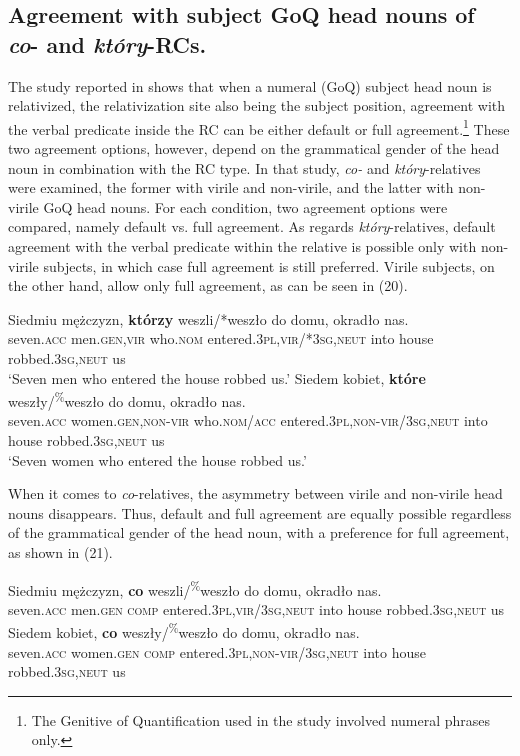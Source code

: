 \documentclass[output=paper]{langsci/langscibook}
\begin{document}
\subsection{Agreement with subject GoQ head nouns of \textit{co}{}- and \textit{który}{}-RCs.}%
The study reported in \citet{Łęska2016} shows that when a numeral (GoQ) subject head noun is relativized, the relativization site also being the subject position, agreement with the verbal predicate inside the RC can be either default or full agreement.\footnote{The Genitive of Quantification used in the study involved numeral phrases only.} These two agreement options, however, depend on the grammatical gender of the head noun in combination with the RC type. In that study, \textit{co-} and \textit{który}{}-relatives were examined, the former with virile and non-virile, and the latter with non-virile GoQ head nouns. For each condition, two agreement options were compared, namely default vs. full agreement. As regards \textit{który}{}-relatives, default agreement with the verbal predicate within the relative is possible only with non-virile subjects, in which case full agreement is still preferred. Virile subjects, on the other hand, allow only full agreement, as can be seen in (20).

\ea%
    \label{ex:leska:20}
    \ea
    \gll Siedmiu   mężczyzn,  \textbf{którzy}   weszli/*weszło  do   domu,   okradło     nas.        \\
          seven.\textsc{acc}   men.\textsc{gen,vir}   who.\textsc{nom}  entered.\textsc{3pl,vir/*3sg,neut}       into  house     robbed.\textsc{3sg,neut}   us   \\
    \glt ‘Seven men who entered the house robbed us.’
    \ex
    \gll  Siedem   kobiet,     \textbf{które}   weszły/\textsuperscript{\%}weszło       do   domu,   okradło     nas.  \\
           seven.\textsc{acc}   women.\textsc{gen,non-vir} who.\textsc{nom/acc}  entered.\textsc{3pl,non-vir}/\textsc{3sg,neut}  into   house     robbed.\textsc{3sg,neut}   us\\
    \glt  ‘Seven women who entered the house robbed us.’
    \z
\z    

When it comes to \textit{co}{}-relatives, the asymmetry between virile and non-virile head nouns disappears. Thus, default and full agreement are equally possible regardless of the grammatical gender of the head noun, with a preference for full agreement, as shown in (21).
 
\ea%
    \label{ex:leska:21}
    \ea
    \gll Siedmiu   mężczyzn,   \textbf{co}   weszli/\textsuperscript{\%}weszło     do domu, okradło     nas.\\
         seven.\textsc{acc}   men.\textsc{gen}   \textsc{comp}   entered.\textsc{3pl,vir}/\textsc{3sg,neut} into         house   robbed.\textsc{3sg,neut} us\\
    \ex
    \gll Siedem   kobiet,   \textbf{co}   weszły/\textsuperscript{\%}weszło   \textsc{} do   domu,   okradło     nas.      \\
         seven.\textsc{acc}   women.\textsc{gen}   \textsc{comp}   entered.\textsc{3pl,non-vir/3sg,neut}    into   house     robbed.\textsc{3sg,neut} us \\
    \z
\z    
\end{document}
